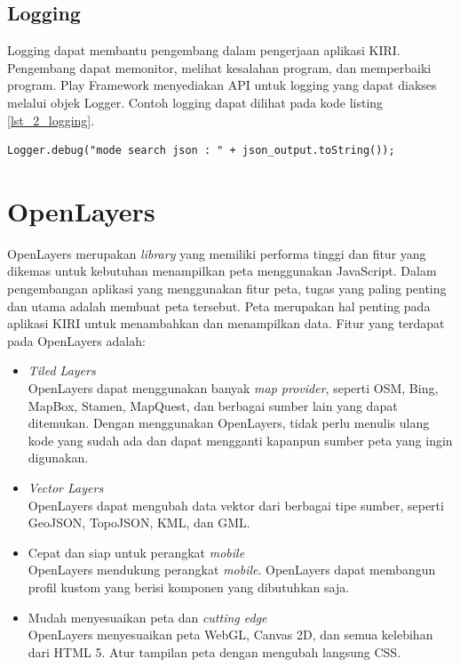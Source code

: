 \subsection{Logging}
Logging dapat membantu pengembang dalam pengerjaan aplikasi KIRI. Pengembang dapat memonitor, melihat kesalahan program, dan memperbaiki program. Play Framework menyediakan API untuk logging yang dapat diakses melalui objek Logger. Contoh logging dapat dilihat pada kode listing \ref{lst_2_logging}.

\begin{lstlisting}[caption=Contoh logging menggunakan objek Logger,label = {lst_2_logging}]
	 Logger.debug("mode search json : " + json_output.toString());
\end{lstlisting} 

\section{OpenLayers}
\label{sec:openlayers}
OpenLayers \cite{openlayersbook} merupakan \textit{library} yang memiliki performa tinggi dan fitur yang dikemas untuk kebutuhan menampilkan peta menggunakan JavaScript. Dalam pengembangan aplikasi yang menggunakan fitur peta, tugas yang paling penting dan utama adalah membuat peta tersebut. Peta merupakan hal penting pada aplikasi KIRI untuk menambahkan dan menampilkan data. Fitur yang terdapat pada OpenLayers adalah:

\begin{itemize}
\item \textit{Tiled Layers}\\
			OpenLayers dapat menggunakan banyak \textit{map provider}, seperti OSM, Bing, MapBox, Stamen, MapQuest, dan berbagai sumber lain yang dapat ditemukan. Dengan menggunakan OpenLayers, tidak perlu menulis ulang kode yang sudah ada dan dapat mengganti kapanpun sumber peta yang ingin digunakan.
	\item \textit{Vector Layers}\\
			OpenLayers dapat mengubah data vektor dari berbagai tipe sumber, seperti GeoJSON, TopoJSON, KML, dan GML.
	\item Cepat dan siap untuk perangkat \textit{mobile}\\
			OpenLayers mendukung perangkat \textit{mobile}. OpenLayers dapat membangun profil kustom yang berisi komponen yang dibutuhkan saja.
	\item Mudah menyesuaikan peta dan \textit{cutting edge}\\
			OpenLayers menyesuaikan peta WebGL, Canvas 2D, dan semua kelebihan dari HTML 5. Atur tampilan peta dengan mengubah langsung CSS.
\end{itemize}

